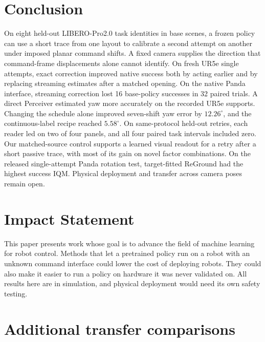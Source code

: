 \documentclass{article}
\theoremstyle{plain}
\theoremstyle{remark}
\begin{document}
\section{Conclusion}

On eight held-out LIBERO-Pro2.0 task identities in base scenes, a frozen policy can use a short trace from one layout to calibrate a second attempt on another under imposed planar command shifts. A fixed camera supplies the direction that command-frame displacements alone cannot identify. On fresh UR5e single attempts, exact correction improved native success both by acting earlier and by replacing streaming estimates after a matched opening. On the native Panda interface, streaming correction lost 16 base-policy successes in 32 paired trials. A direct Perceiver estimated yaw more accurately on the recorded UR5e supports. Changing the schedule alone improved seven-shift yaw error by $12.26^\circ$, and the continuous-label recipe reached $5.58^\circ$. On same-protocol held-out retries, each reader led on two of four panels, and all four paired task intervals included zero. Our matched-source control supports a learned visual readout for a retry after a short passive trace, with most of its gain on novel factor combinations. On the released single-attempt Panda rotation test, target-fitted ReGround had the highest success IQM. Physical deployment and transfer across camera poses remain open.

\section*{Impact Statement}

This paper presents work whose goal is to advance the field of machine learning for robot control. Methods that let a pretrained policy run on a robot with an unknown command interface could lower the cost of deploying robots. They could also make it easier to run a policy on hardware it was never validated on. All results here are in simulation, and physical deployment would need its own safety testing.





\clearpage
\onecolumn
\appendix
\section{Additional transfer comparisons}
\end{document}
